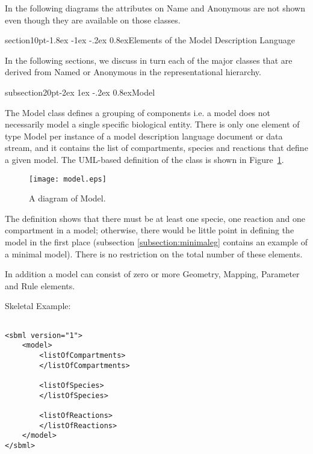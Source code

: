 \documentclass[10pt]{article}
\makeatletter
\renewcommand{\section}{\@startsection%
  {section}{1}{0pt}{-1.8ex \@plus -1ex \@minus -.2ex}%
  {0.8ex}{\normalfont\Large\bfseries}}
\renewcommand{\subsection}{\@startsection%
  {subsection}{2}{0pt}{-2ex \@plus 1ex \@minus -.2ex}%
  {0.8ex}{\slshape\large\bfseries}}
\newcommand{\tightspacing}{\renewcommand{\baselinestretch}{0.85}}
\newcommand{\regularspacing}{\renewcommand{\baselinestretch}{1.0}}
\newcommand{\class}[1]{\textsf{#1}}
\makeatother
\begin{document}
In the following diagrams the attributes on \class{Name} and
\class{Anonymous} are not shown even though they are available on
those classes.

\section{Elements of the Model Description Language}
\label{sec:elements}

In the following sections, we discuss in turn each of the major
classes that are derived from \class{Named} or \class{Anonymous}
in the representational hierarchy.


\subsection{Model}

The \class{Model} class defines a grouping of components i.e. a
model does not necessarily model a single specific biological
entity.  There is only one element of type \class{Model} per
instance of a model description language document or data stream,
and it contains the list of compartments, species and reactions
that define a given model.  The UML-based definition of the class
is shown in Figure~\ref{fig:model}.

\begin{figure}[h]
  \centering
  \texttt{[image: model.eps]}
  \caption{A diagram of \class{Model}.}
  \label{fig:model}
\end{figure}

The definition shows that there must be at least one specie, one reaction
and one compartment in a model; otherwise, there would be little point in
defining the model in the first place
(subsection \ref{subsection:minimaleg} contains an example of a minimal model).
There is no restriction on the total number of these elements.

In addition a model can consist of zero or more \class{Geometry}, \class{Mapping},
\class{Parameter} and \class{Rule} elements.

Skeletal Example:

\begin{small}
\tightspacing
\begin{verbatim}

<sbml version="1">
    <model>
        <listOfCompartments>
        </listOfCompartments>

        <listOfSpecies>
        </listOfSpecies>

        <listOfReactions>
        </listOfReactions>
    </model>
</sbml>

\end{verbatim}
\regularspacing
\end{small}
\end{document}
